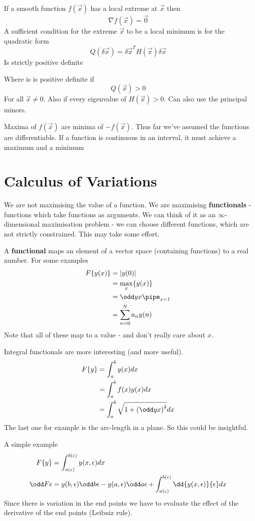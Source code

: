 \documentclass{X:/Documents/Coding/Latex/myassignment}
\begin{document}
If a smooth function $f(\vec x)$ has a local extreme at $\vec x$ then
\[\nabla f(\vec x) = \vec 0\]
A sufficient condition for the extreme $\vec x$ to be a local minimum is for the quadratic form
\[Q(\delta \vec x) = \delta \vec x^T H(\vec x) \delta \vec x\]
Is strictly positive definite

Where is is positive definite if 
\[Q(\vec x) > 0\]
For all $\vec x \neq 0$. Also if every eigenvalue of $H(\vec x) > 0$.
Can also use the principal minors.

Maxima of $f(\vec x)$ are minima of $-f(\vec x)$. 
Thus far we've assumed the functions are differentiable.
If a function is continuous in an interval, it must achieve a maximum and a minimum

\section{Calculus of Variations}
We are not maximising the value of a function. We are maximising \textbf{functionals} - functions which take functions as arguments.
We can think of it as an $\infty$- dimensional maximisation problem - we can choose different functions, which are not strictly constrained. 
This may take some effort.

A \textbf{functional} maps an element of a vector space (containing functions) to a real number.
For some examples
\begin{align*}
	F\{y(x)\} &= |y(0)|\\
	&= \max_x \{y(x)\}\\
	&= \odd yx \pipe_{x=1}\\
	&= \sum_{n=0}^N a_n y(n)
\end{align*}
Note that all of these map to a value - and don't really care about $x$.


Integral functionals are more interesting (and more useful).
\begin{align*}
	F\{y\} &= \int_a^b y(x)dx\\
	&= \int_a^b f(x) y(x) dx\\
	&= \int_a^b \sqrt{1+\left(\odd yx\right)^2} dx
\end{align*}
The last one for example is the arc-length in a plane. So this could be insightful.

A simple example
\begin{align*}
	F\{y\} &= \int_{a(\epsilon)}^{b(\epsilon)} y(x,\epsilon) dx\\
	\odd F\epsilon &= y(b,\epsilon) \odd b\epsilon - y(a,\epsilon) \odd a \epsilon + \int_{a(\epsilon)}^{b(\epsilon)} \dd{y(x,\epsilon)}{\epsilon} dx
\end{align*}
Since there is variation in the end points we have to evaluate the effect of the derivative of the end points (Leibniz rule). 
\end{document}
